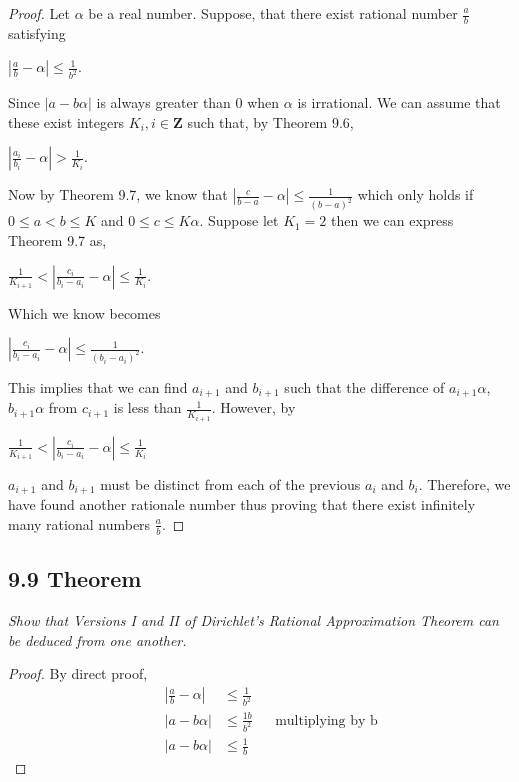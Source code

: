 \documentclass{article}
\begin{document}
\begin{proof}
Let $\alpha$ be a real number. Suppose, that there exist rational number $\frac{a}{b}$ satisfying
\begin{center}
    $|\frac{a}{b}-\alpha| \leq \frac{1}{b^2}$.
\end{center}
Since $|a - b\alpha|$ is always greater than 0 when $\alpha$ is irrational. We can assume that these exist integers $K_i, i \in \mathbf{Z}$ such that, by Theorem 9.6,
\begin{center}
    $|\frac{a_i}{b_i}-\alpha| > \frac{1}{K_i}$.
\end{center}
Now by Theorem 9.7, we know that  $|\frac{c}{b-a}-\alpha| \leq \frac{1}{(b-a)^2}$ which only holds if  $0 \leq a < b \leq K$ and $0 \leq c \leq K\alpha$. Suppose let $K_1 = 2$ then we can express Theorem 9.7 as,
\begin{center}
    $\frac{1}{K_{i+1}} < |\frac{c_i}{b_i-a_i}-\alpha| \leq \frac{1}{K_i}$.
\end{center}
Which we know becomes
\begin{center}
    $|\frac{c_i}{b_i-a_i}-\alpha| \leq \frac{1}{(b_i-a_i)^2}$.
\end{center}
This implies that we can find $a_{i+1}$ and $b_{i+1}$ such that the difference of $a_{i+1}\alpha$, $b_{i+1}\alpha$ from $c_{i+1}$ is less than $\frac{1}{K_{i+1}}$. However, by
\begin{center}
    $\frac{1}{K_{i+1}} < |\frac{c_i}{b_i-a_i}-\alpha| \leq \frac{1}{K_i}$
\end{center}
$a_{i+1}$ and $b_{i+1}$ must be distinct from each of the previous $a_i$ and $b_i$. Therefore, we have found another rationale number thus proving that there exist infinitely many rational numbers $\frac{a}{b}$.
\end{proof}

\subsection*{9.9 Theorem} 
\quad \textit{Show that Versions I and II of Dirichlet's Rational Approximation Theorem can be deduced from one another.}

\begin{proof}
By direct proof, 
\begin{align*}
    &&|\frac{a}{b}-\alpha| &\leq \frac{1}{b^2} &&\\
    &&|a-b\alpha| &\leq \frac{1b}{b^2} && \text{multiplying by b}\\
    &&|a-b\alpha| &\leq \frac{1}{b} &&
\end{align*}
\end{proof}
\end{document}

